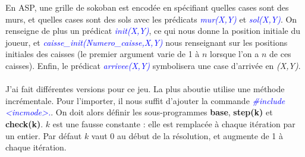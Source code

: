 \documentclass[10pt,a4paper]{article}
\begin{document}
En ASP, une grille de sokoban est encodée en spécifiant quelles cases sont des murs, et quelles cases sont des sols avec les prédicats \emph{\textcolor{blue}{mur(X,Y)}} et \emph{\textcolor{blue}{sol(X,Y)}}. On renseigne de plus un 
prédicat \emph{\textcolor{blue}{init(X,Y)}}, ce qui nous donne la position initiale du joueur, et \emph{\textcolor{blue}{caisse\_init(Numero\_caisse,X,Y)}} nous renseignant sur les positions initiales des caisses (le premier 
argument varie de 1 à $n$ lorsque l'on a $n$ de ces caisses). Enfin, le prédicat \emph{\textcolor{blue}{arrivee(X,Y)}} symbolisera une case d'arrivée en \emph{(X,Y)}.\\ \\
J'ai fait différentes versions pour ce jeu. La plus aboutie utilise une méthode incrémentale. Pour l'importer, il nous suffit d'ajouter la commande \emph{\textcolor{blue}{\#include \textless incmode\textgreater .}}. On doit alors 
définir les sous-programmes \textbf{base}, \textbf{step(k)} et \textbf{check(k)}. $k$ est une fausse constante : elle est remplacée à chaque itération par un entier. Par défaut $k$ vaut 0 au début de la résolution, et augmente de 1 
à chaque itération.\\
\end{document}
